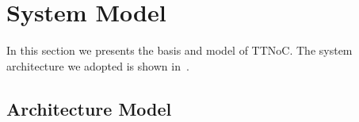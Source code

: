 \documentclass[journal]{IEEEtran}
\theoremstyle{remark}
\begin{document}
%



\section{System Model}
\label{s:model}

In this section we presents the basis and model of TTNoC.
The system architecture we adopted is shown in~\cite{DBLP:conf/rtcsa/PaukovitsK08}. 

\subsection{Architecture Model}
\end{document}
